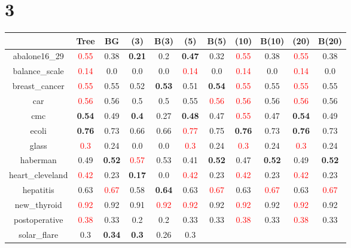 \documentclass{article}%
\begin{document}
\section*{3}%
\begin{tabular}{c|cccccccccc}%
\hline%
&Tree&BG&(3)&B(3)&(5)&B(5)&(10)&B(10)&(20)&B(20)\\%
\hline%
abalone16\_29&\textcolor{red}{ 
0.55
}&0.38&\textbf{0.21}&0.2&\textbf{0.47}&0.32&\textcolor{red}{ 
0.55
}&0.38&\textcolor{red}{ 
0.55
}&0.38\\%
\hline%
balance\_scale&\textcolor{red}{ 
0.14
}&0.0&0.0&0.0&\textcolor{red}{ 
0.14
}&0.0&\textcolor{red}{ 
0.14
}&0.0&\textcolor{red}{ 
0.14
}&0.0\\%
\hline%
breast\_cancer&\textcolor{red}{ 
0.55
}&0.55&0.52&\textbf{0.53}&0.51&\textbf{0.54}&\textcolor{red}{ 
0.55
}&0.55&\textcolor{red}{ 
0.55
}&0.55\\%
\hline%
car&\textcolor{red}{ 
0.56
}&0.56&0.5&0.5&0.55&\textcolor{red}{ 
0.56
}&\textcolor{red}{ 
0.56
}&0.56&\textcolor{red}{ 
0.56
}&0.56\\%
\hline%
cmc&\textbf{0.54}&0.49&\textbf{0.4}&0.27&\textbf{0.48}&0.47&\textcolor{red}{ 
0.55
}&0.47&\textbf{0.54}&0.49\\%
\hline%
ecoli&\textbf{0.76}&0.73&0.66&0.66&\textcolor{red}{ 
0.77
}&0.75&\textbf{0.76}&0.73&\textbf{0.76}&0.73\\%
\hline%
glass&\textcolor{red}{ 
0.3
}&0.24&0.0&0.0&\textcolor{red}{ 
0.3
}&0.24&\textcolor{red}{ 
0.3
}&0.24&\textcolor{red}{ 
0.3
}&0.24\\%
\hline%
haberman&0.49&\textbf{0.52}&\textcolor{red}{ 
0.57
}&0.53&0.41&\textbf{0.52}&0.47&\textbf{0.52}&0.49&\textbf{0.52}\\%
\hline%
heart\_cleveland&\textcolor{red}{ 
0.42
}&0.23&\textbf{0.17}&0.0&\textcolor{red}{ 
0.42
}&0.23&\textcolor{red}{ 
0.42
}&0.23&\textcolor{red}{ 
0.42
}&0.23\\%
\hline%
hepatitis&0.63&\textcolor{red}{ 
0.67
}&0.58&\textbf{0.64}&0.63&\textcolor{red}{ 
0.67
}&0.63&\textcolor{red}{ 
0.67
}&0.63&\textcolor{red}{ 
0.67
}\\%
\hline%
new\_thyroid&\textcolor{red}{ 
0.92
}&0.92&0.91&\textcolor{red}{ 
0.92
}&\textcolor{red}{ 
0.92
}&0.92&\textcolor{red}{ 
0.92
}&0.92&\textcolor{red}{ 
0.92
}&0.92\\%
\hline%
postoperative&\textcolor{red}{ 
0.38
}&0.33&0.2&0.2&0.33&0.33&\textcolor{red}{ 
0.38
}&0.33&\textcolor{red}{ 
0.38
}&0.33\\%
\hline%
solar\_flare&0.3&\textbf{0.34}&\textbf{0.3}&0.26&0.3&\textcolor{red}{ 
}
\end{tabular}
\end{document}
